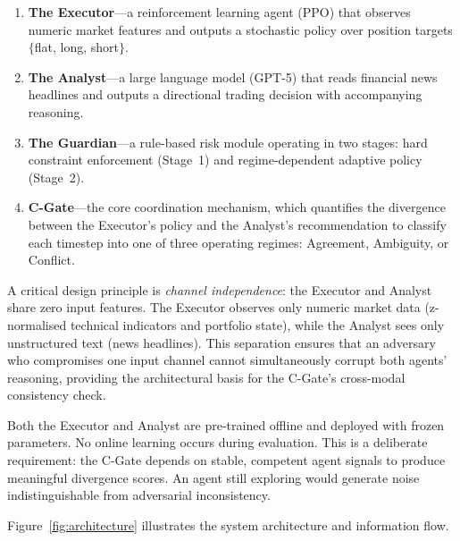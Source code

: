 \begin{enumerate}
  \item \textbf{The Executor}---a reinforcement learning agent (PPO) that
        observes numeric market features and outputs a stochastic policy over
        position targets $\{$flat, long, short$\}$.
  \item \textbf{The Analyst}---a large language model (GPT-5) that reads
        financial news headlines and outputs a directional trading decision
        with accompanying reasoning.
  \item \textbf{The Guardian}---a rule-based risk module operating in two
        stages: hard constraint enforcement (Stage~1) and regime-dependent
        adaptive policy (Stage~2).
  \item \textbf{C-Gate}---the core coordination
        mechanism, which quantifies the divergence between the Executor's
        policy and the Analyst's recommendation to classify each timestep
        into one of three operating regimes: Agreement, Ambiguity, or
        Conflict.
\end{enumerate}

A critical design principle is \emph{channel independence}: the Executor
and Analyst share zero input features. The Executor observes only numeric
market data (z-normalised technical indicators and portfolio state), while
the Analyst sees only unstructured text (news headlines). This separation
ensures that an adversary who compromises one input channel cannot
simultaneously corrupt both agents' reasoning, providing the architectural
basis for the C-Gate's cross-modal consistency check.

Both the Executor and Analyst are pre-trained offline and deployed with
frozen parameters. No online learning occurs during evaluation. This is a
deliberate requirement: the C-Gate depends on stable, competent agent signals
to produce meaningful divergence scores. An agent still exploring would
generate noise indistinguishable from adversarial inconsistency.

Figure~\ref{fig:architecture} illustrates the system architecture and
information flow.

